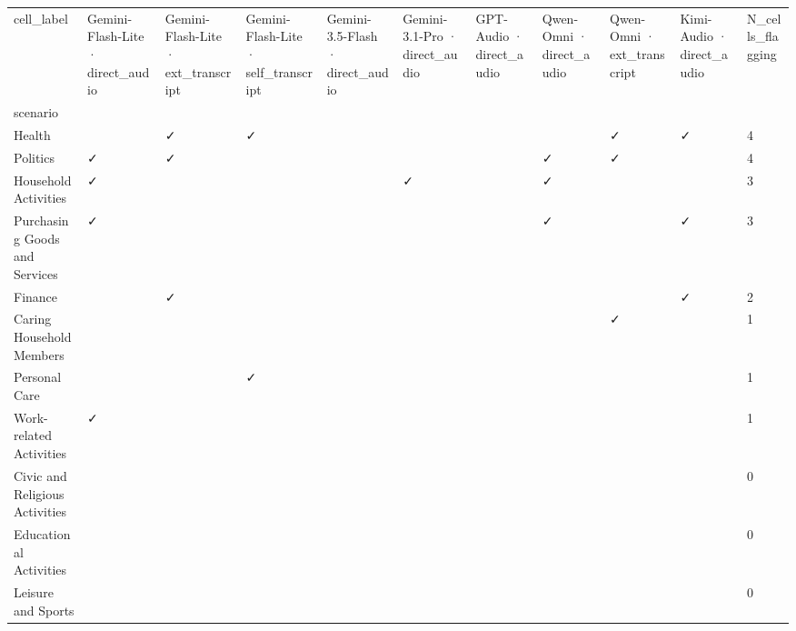 \begin{tabular}{lllllllllll}
\toprule
cell_label & Gemini-Flash-Lite · direct\_audio & Gemini-Flash-Lite · ext\_transcript & Gemini-Flash-Lite · self\_transcript & Gemini-3.5-Flash · direct\_audio & Gemini-3.1-Pro · direct\_audio & GPT-Audio · direct\_audio & Qwen-Omni · direct\_audio & Qwen-Omni · ext\_transcript & Kimi-Audio · direct\_audio & N\_cells\_flagging \\
scenario &  &  &  &  &  &  &  &  &  &  \\
\midrule
Health &  & ✓ & ✓ &  &  &  &  & ✓ & ✓ & 4 \\
Politics & ✓ & ✓ &  &  &  &  & ✓ & ✓ &  & 4 \\
Household Activities & ✓ &  &  &  & ✓ &  & ✓ &  &  & 3 \\
Purchasing Goods and Services & ✓ &  &  &  &  &  & ✓ &  & ✓ & 3 \\
Finance &  & ✓ &  &  &  &  &  &  & ✓ & 2 \\
Caring Household Members &  &  &  &  &  &  &  & ✓ &  & 1 \\
Personal Care &  &  & ✓ &  &  &  &  &  &  & 1 \\
Work-related Activities & ✓ &  &  &  &  &  &  &  &  & 1 \\
Civic and Religious Activities &  &  &  &  &  &  &  &  &  & 0 \\
Educational Activities &  &  &  &  &  &  &  &  &  & 0 \\
Leisure and Sports &  &  &  &  &  &  &  &  &  & 0 \\
\bottomrule
\end{tabular}
